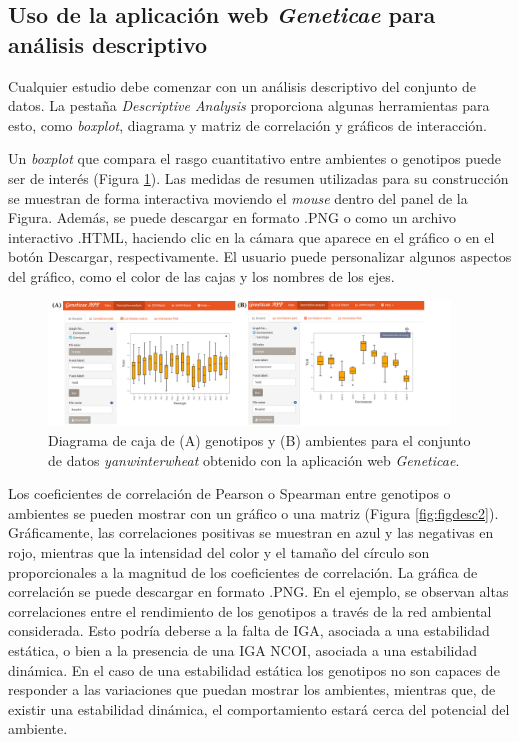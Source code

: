 \hspace{1cm}


\subsection{Uso de la aplicación web \emph{Geneticae} para análisis descriptivo}

Cualquier estudio debe comenzar con un análisis descriptivo del conjunto de datos. La pestaña \emph{Descriptive Analysis} proporciona algunas herramientas para esto, como  \emph{boxplot}, diagrama y matriz de correlación y gráficos de interacción.

Un \emph{boxplot} que compara el rasgo cuantitativo entre ambientes o genotipos puede ser de interés (Figura \ref{fig:figdesc1}). Las medidas de resumen utilizadas para su construcción se muestran de forma interactiva moviendo el \emph{mouse} dentro del panel de la Figura. Además, se puede descargar en formato .PNG o como un archivo interactivo .HTML, haciendo clic en la cámara que aparece en el gráfico o en el botón Descargar, respectivamente. El usuario puede personalizar algunos aspectos del gráfico, como el color de las cajas y los nombres de los ejes. 

\begin{figure}[h]
	\begin{center}
		\includegraphics[width=0.95\textwidth]{./Graficos/www/boxplot.png}
	\end{center}
	\caption{Diagrama de caja de (A) genotipos y (B) ambientes para el conjunto de datos \emph{yanwinterwheat} obtenido con la aplicación web \emph{Geneticae}.}
	\label{fig:figdesc1}
\end{figure}


Los coeficientes de correlación de Pearson o Spearman entre genotipos o ambientes se pueden mostrar con un gráfico o una matriz (Figura \ref{fig:figdesc2}). Gráficamente, las correlaciones positivas se muestran en azul y las negativas en rojo, mientras que la intensidad del color y el tamaño del círculo son proporcionales a la magnitud de los coeficientes de correlación. La gráfica de correlación se puede descargar en formato .PNG. En el ejemplo, se observan altas correlaciones entre el rendimiento de los genotipos a través de la red ambiental considerada. Esto podría deberse a la falta de IGA, asociada a una estabilidad estática, o bien a la presencia de una IGA NCOI, asociada a una estabilidad dinámica. En el caso de una estabilidad estática  los genotipos no son capaces de responder a las variaciones que puedan mostrar los ambientes, mientras que, de existir una estabilidad dinámica, el comportamiento estará cerca del potencial del ambiente. 

